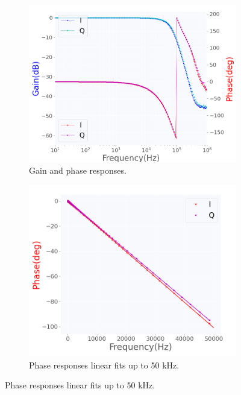 \documentclass[12pt]{article}
\begin{document}
\begin{figure}[H]
    \centering
    \begin{subfigure}{0.52\textwidth}
    \includegraphics[width=\textwidth]{besselbest.png}
    \caption{Gain and phase responses.}
    \end{subfigure}
    \begin{subfigure}{0.47\textwidth}
     \includegraphics[width=\textwidth]{fitbessel.png}
           \caption{Phase responses linear fits up to 50 kHz.}
    \end{subfigure}
    \end{figure}
\end{document}
